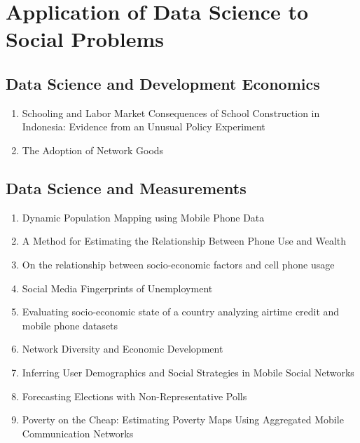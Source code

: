 \section{Application of Data Science to Social Problems}
\subsection{Data Science and Development Economics}

\begin{enumerate}
\item Schooling and Labor Market Consequences of School Construction in Indonesia: Evidence from an Unusual Policy Experiment  \cite{Duflo_2000}
\item The Adoption of Network Goods  \cite{Bjorkegren}
\end{enumerate}

\subsection{Data Science and Measurements}
\begin{enumerate}
\item Dynamic Population Mapping using Mobile Phone Data\cite{Deville_2014}
\item A Method for Estimating the Relationship Between Phone Use and Wealth
\item On the relationship between socio-economic factors and cell phone usage \cite{Frias_Martinez_2012}
\item Social Media Fingerprints of Unemployment 
\item Evaluating socio-economic state of a country analyzing airtime credit and mobile phone datasets
\item Network Diversity and Economic Development
\item Inferring User Demographics and Social Strategies in Mobile Social Networks \cite{Dong:2014:IUD:2623330.2623703}
\item Forecasting Elections with Non-Representative Polls\cite{Wang2015980}
\item Poverty on the Cheap: Estimating Poverty Maps Using Aggregated Mobile Communication Networks\cite{Smith-Clarke:2014:PCE:2556288.2557358}
\end{enumerate}

